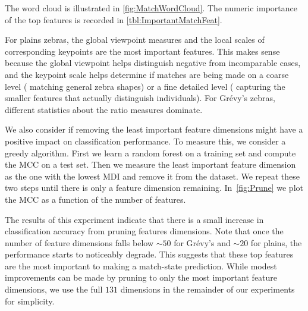         The word cloud is illustrated in \cref{fig:MatchWordCloud}.
        The numeric importance of the top features is recorded in \cref{tbl:ImportantMatchFeat}.

        For plains zebras, the global viewpoint measures and the local scales of corresponding keypoints are the
          most important features.
        This makes sense because the global viewpoint helps distinguish negative from incomparable cases, and the
          keypoint scale helps determine if matches are being made on a coarse level (\eg{} matching general zebra
          shapes) or a fine detailed level (\ie{} capturing the smaller features that actually distinguish
          individuals).
        For Grévy's zebras, different statistics about the ratio measures dominate.

        \MatchWordCloud{}
        \ImportantMatchFeat{}

        We also consider if removing the least important feature dimensions might have a positive impact on
          classification performance.
        To measure this, we consider a greedy algorithm.
        First we learn a random forest on a training set and compute the MCC on a test set.
        Then we measure the least important feature dimension as the one with the lowest MDI and remove it from
          the dataset.
        We repeat these two steps until there is only a feature dimension remaining.
        In~\cref{fig:Prune} we plot the MCC as a function of the number of features.

        The results of this experiment indicate that there is a small increase in classification accuracy from
          pruning features dimensions.
        Note that once the number of feature dimensions falls below ${\sim}50$ for Grévy's and ${\sim}20$ for
          plains, the performance starts to noticeably degrade.
        This suggests that these top features are the most important to making a match-state prediction.
        While modest improvements can be made by pruning to only the most important feature dimensions, we use
          the full $131$ dimensions in the remainder of our experiments for simplicity.



